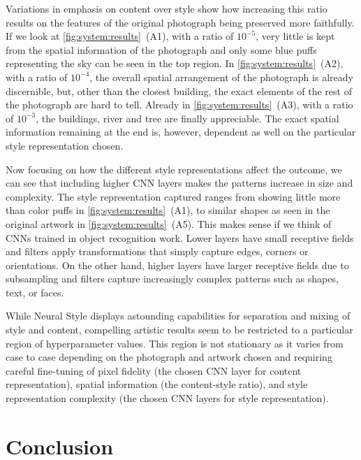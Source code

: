 Variations in emphasis on content over style show how increasing this ratio results on the features of the original photograph being preserved more faithfully.
If we look at \autoref{fig:system:results}~(A1), with a ratio of $10^{-5}$, very little is kept from the spatial information of the photograph and only some blue puffs representing the sky can be seen in the top region.
In \autoref{fig:system:results}~(A2), with a ratio of $10^{-4}$, the overall spatial arrangement of the photograph is already discernible, but, other than the closest building, the exact elements of the rest of the photograph are hard to tell.
Already in \autoref{fig:system:results}~(A3), with a ratio of $10^{-3}$, the buildings, river and tree are finally appreciable.
The exact spatial information remaining at the end is, however, dependent as well on the particular style representation chosen.

Now focusing on how the different style representations affect the outcome, we can see that including higher CNN layers makes the patterns increase in size and complexity.
The style representation captured ranges from showing little more than color puffs in \autoref{fig:system:results}~(A1), to similar shapes as seen in the original artwork in \autoref{fig:system:results}~(A5).
This makes sense if we think of CNNs trained in object recognition work.
Lower layers have small receptive fields and filters apply transformations that simply capture edges, corners or orientations.
On the other hand, higher layers have larger receptive fields due to subsampling and filters capture increasingly complex patterns such as shapes, text, or faces.

While Neural Style displays astounding capabilities for separation and mixing of style and content, compelling artistic results seem to be restricted to a particular region of hyperparameter values.
This region is not stationary as it varies from case to case depending on the photograph and artwork chosen and requiring careful fine-tuning of pixel fidelity (the chosen CNN layer for content representation), spatial information (the content-style ratio), and style representation complexity (the chosen CNN layers for style representation).



\section{Conclusion}
\label{sec:system:conclusion}

